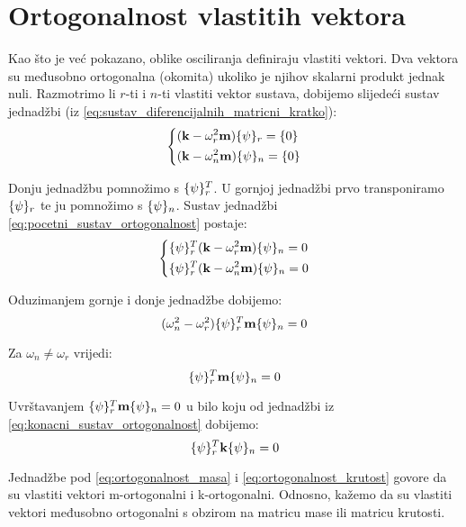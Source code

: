 \section{Ortogonalnost vlastitih vektora}
Kao što je već pokazano, oblike osciliranja definiraju vlastiti vektori. Dva vektora su
međusobno ortogonalna (okomita) ukoliko je njihov skalarni produkt jednak nuli.
Razmotrimo li $r$-ti i $n$-ti vlastiti vektor sustava, dobijemo slijedeći sustav jednadžbi 
(iz \eqref{eq:sustav_diferencijalnih_matricni_kratko}):
\begin{equation}\label{eq:pocetni_sustav_ortogonalnost}
    \begin{dcases}
        (\kk-\omega_r^2\mm)\vtor{\psi}{}_r=\vtor{0}{}\\
        (\kk-\omega_n^2\mm)\vtor{\psi}{}_n=\vtor{0}{}
    \end{dcases}
\end{equation}

Donju jednadžbu pomnožimo s $\vtor{\psi}{}_r^T$. U gornjoj jednadžbi prvo
transponiramo $\vtor{\psi}{}_r$ te ju pomnožimo s $\vtor{\psi}{}_n$. Sustav jednadžbi
\eqref{eq:pocetni_sustav_ortogonalnost} postaje:
\begin{equation}\label{eq:konacni_sustav_ortogonalnost}
    \begin{dcases}
        \vtor{\psi}{}_r^T(\kk-\omega_r^2\mm)\vtor{\psi}{}_n=0\\
        \vtor{\psi}{}_r^T(\kk-\omega_n^2\mm)\vtor{\psi}{}_n=0
    \end{dcases}
\end{equation}

Oduzimanjem gornje i donje jednadžbe dobijemo:
\begin{equation}
    (\omega_n^2-\omega_r^2)\vtor{\psi}{}_r^T\mm\vtor{\psi}{}_n=0
\end{equation}

Za $\omega_n\neq\omega_r$ vrijedi:
\begin{equation}\label{eq:ortogonalnost_masa}
    \vtor{\psi}{}_r^T\mm\vtor{\psi}{}_n=0
\end{equation}

Uvrštavanjem $\vtor{\psi}{}_r^T\mm\vtor{\psi}{}_n=0$ u bilo koju od jednadžbi iz
\eqref{eq:konacni_sustav_ortogonalnost} dobijemo:
\begin{equation}\label{eq:ortogonalnost_krutost}
    \vtor{\psi}{}_r^T\kk\vtor{\psi}{}_n=0
\end{equation}

Jednadžbe pod \eqref{eq:ortogonalnost_masa} i \eqref{eq:ortogonalnost_krutost}
govore da su vlastiti vektori m-ortogonalni i k-ortogonalni. Odnosno, kažemo da su
vlastiti vektori međusobno ortogonalni s obzirom na matricu mase ili matricu
krutosti. 
\par

